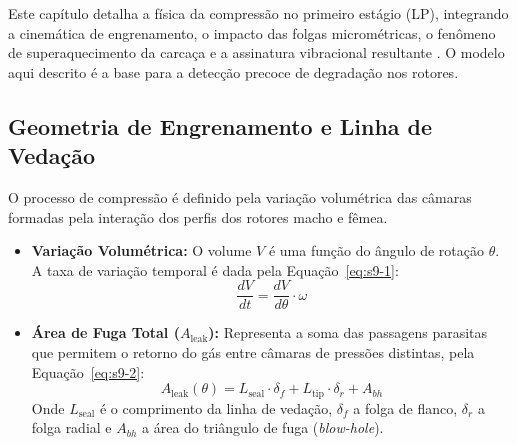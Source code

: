 \documentclass[12pt,a4paper]{article}
\numberwithin{equation}{section}
\numberwithin{table}{section}
\numberwithin{figure}{section}
\begin{document}


	Este capítulo detalha a física da compressão no primeiro estágio (LP), integrando a cinemática de engrenamento, o impacto das folgas micrométricas, o fenômeno de superaquecimento da carcaça e a assinatura vibracional resultante \cite{bently}. O modelo aqui descrito é a base para a detecção precoce de degradação nos rotores.
	
	\subsection{\textbf{Geometria de Engrenamento e Linha de Vedação}}
	O processo de compressão é definido pela variação volumétrica das câmaras formadas pela interação dos perfis dos rotores macho e fêmea.
	\begin{itemize}
		\item \textbf{Variação Volumétrica:} O volume $V$ é uma função do ângulo de rotação $\theta$. A taxa de variação temporal é dada pela Equação~\eqref{eq:s9-1}:
		\begin{equation}\label{eq:s9-1}
 \frac{dV}{dt} = \frac{dV}{d\theta} \cdot \omega 
\end{equation}
		\item \textbf{Área de Fuga Total ($A_{\text{leak}}$):} Representa a soma das passagens parasitas que permitem o retorno do gás entre câmaras de pressões distintas, pela Equação~\eqref{eq:s9-2}:
		\begin{equation}\label{eq:s9-2}
 A_{\text{leak}}(\theta) = L_{\text{seal}} \cdot \delta_f + L_{\text{tip}} \cdot \delta_r + A_{bh} 
\end{equation}
		Onde $L_{\text{seal}}$ é o comprimento da linha de vedação, $\delta_f$ a folga de flanco, $\delta_r$ a folga radial e $A_{bh}$ a área do triângulo de fuga (\textit{blow-hole}).
	\end{itemize}
	
\end{document}
